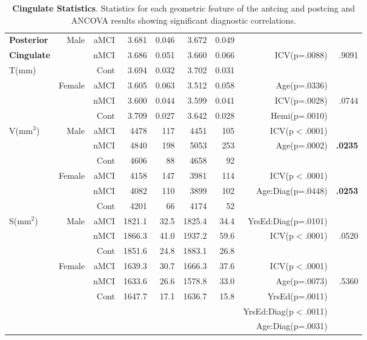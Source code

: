 \documentclass[12pt]{article}\usepackage[]{graphicx}\usepackage[]{color}
\newcommand\T{\rule{0pt}{2.6ex}}
\begin{document}
\begin{table}[p]
\begin{tabular}{l|rr|rrrr|rr}
	\hline\hline
	\textbf{Posterior}  & \multirow{3}{*}{Male} & aMCI\T & 3.681 & 0.046 &3.672 & 0.049 & & \\
	\textbf{Cingulate}						&						& nMCI & 3.686 & 0.051 & 3.660 & 0.066 & ICV(p=.0088) & .9091 \\
		\multirow{2}{*}{T(mm)}					&						& Cont & 3.694 & 0.032 & 3.702 & 0.031 & & \\	\cline{2-9} 				
							&	\multirow{3}{*}{Female}	& aMCI\T & 3.605 & 0.063 & 3.512 & 0.058 & Age(p=.0336) &  \\
							&						& nMCI & 3.600 & 0.044 & 3.599 & 0.041 & ICV(p=.0028)& .0744\\
							&						& Cont & 3.709 & 0.027 & 3.642 & 0.028 & Hemi(p=.0010) & \\
	\hline
	\multirow{6}{*}{V(mm$^3$)} & \multirow{3}{*}{Male} & aMCI\T & 4478 & 117 & 4451 & 105 & ICV(p$<$.0001) &  \\
							&						& nMCI & 4840 & 198 & 5053 & 253 & Age(p=.0002) & \textbf{.0235} \\
							&						& Cont & 4606 & 88 & 4658 & 92 &  & \\ \cline{2-9}
							&	\multirow{3}{*}{Female}	& aMCI\T & 4158 & 147 & 3981 & 114 & ICV(p$<$.0001) & \\
							&						& nMCI & 4082 & 110 & 3899 & 102 & Age:Diag(p=.0448) & \textbf{.0253} \\
							&						& Cont & 4201 & 66 & 4174 & 52 & & \\
	\hline
	\multirow{6}{*}{S(mm$^2$)} & \multirow{3}{*}{Male} & aMCI\T & 1821.1 & 32.5 & 1825.4 & 34.4 & YrsEd:Diag(p=.0101) & \\
							&						& nMCI & 1866.3 & 41.0 & 1937.2 & 59.6 & ICV(p$<$.0001) & .0520 \\
							&						& Cont & 1851.6 & 24.8 & 1883.1 & 26.8 &  & \\\cline{2-9}
							&	\multirow{3}{*}{Female}	& aMCI\T & 1639.3 & 30.7 & 1666.3 & 37.6 & ICV(p$<$.0001) & \\
							&						& nMCI & 1633.6 & 26.6 & 1578.8 & 33.0 & Age(p=.0073) & .5360\\
							&						& Cont & 1647.7 & 17.1 & 1636.7 & 15.8 &  YrsEd(p=.0011)& \\
							&						& & & & & & YrsEd:Diag(p$<$.0011) & \\
							&						& & & & & & Age:Diag(p=.0031) & \\								
	\end{tabular}
	\caption{\textbf{Cingulate Statistics}.  Statistics for each geometric feature of the antcing and postcing and ANCOVA results showing significant diagnostic correlations.}
	\label{Wave1.cing.ANCOVA}
\end{table}
\end{document}
